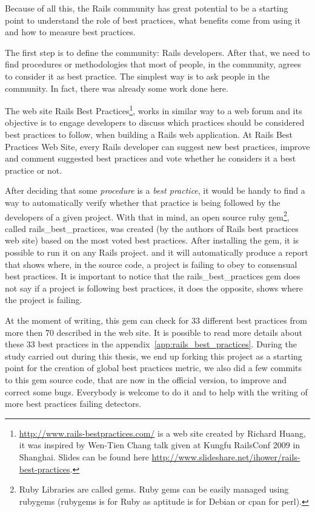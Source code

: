 Because of all this, the Rails community has great potential to be a starting point to understand the role of best practices, 
what benefits come from using it and how to measure best practices.

The first step is to define the community: Rails developers. 
After that, we need to find procedures or methodologies that most of people, in the community, agrees to consider it as best practice.
The simplest way is to ask people in the community. 
In fact, there was already some work done here.

The web site
\textsf{Rails Best Practices}\footnote{\url{http://www.rails-bestpractices.com/} is a web site created by Richard Huang,
it was inspired by Wen-Tien Chang talk given at Kungfu RailsConf 2009 in Shanghai. Slides can be found here
\url{http://www.slideshare.net/ihower/rails-best-practices}.},
works in similar way to a web forum and its objective is to engage developers to discuss which practices
should be considered best practices to follow, when building a Rails web application.
At Rails Best Practices Web Site, every Rails developer can suggest new best practices,
improve and comment suggested best practices and vote whether he considers it a best practice or not.

After deciding that some \emph{procedure} is a \emph{best practice},
it would be handy to find a way to automatically verify whether 
that practice is being followed by the developers of a given project.
With that in mind, an open source ruby 
\textsf{gem}\footnote{
  Ruby Libraries are called gems. Ruby gems can be easily managed using rubygems 
  (rubygems is for Ruby as aptitude is for Debian or cpan for perl).
}, 
called rails\_best\_practices, was created (by the authors of Rails best practices web site) 
based on the most voted best practices. 
After installing the gem, it is possible to run it on any Rails project.
and it will automatically produce a report that shows where,
in the source code, a project is failing to obey to consensual best practices.
It is important to notice that the rails\_best\_practices gem does not say if a project is following best practices,
it does the opposite, shows where the project is failing.

At the moment of writing, this gem can check for 33 different best practices from more then 70 described in the web site.
It is possible to read more details about these 33 best practices in the appendix~\ref{app:rails_best_practices}.
During the study carried out during this thesis, 
we end up forking this project as a starting point for the creation of global best practices metric,
we also did a few commits to this gem source code, that are now in the official version, to improve and correct some bugs. 
Everybody is welcome to do it and to help with the writing of more best practices failing detectors.




